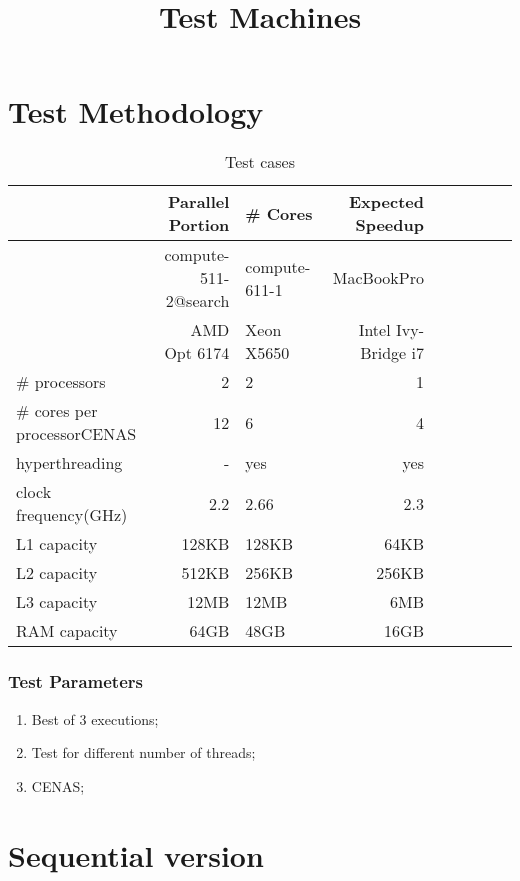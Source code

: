 \documentclass{beamer}
\begin{document}
\section{Test Methodology}
\begin{frame}[plain]
	\title{Test Machines}
		\begin{center}
			\begin{table}[!htp]
			\begin{tabular}{lrlrlrlrl}
			\hline
			 & {Parallel Portion} & \textbf{\# Cores} & \textbf{Expected Speedup}\\
			\hline
			 & compute-511-2@search & compute-611-1 & MacBookPro\\
			 & AMD Opt 6174 & Xeon X5650 & Intel Ivy-Bridge i7\\
			\# processors & 2 & 2 & 1\\
			\# cores per processorCENAS & 12 & 6 & 4\\
			hyperthreading & - & yes & yes\\
			clock frequency(GHz) & 2.2 & 2.66 & 2.3\\
			L1 capacity & 128KB & 128KB & 64KB\\
			L2 capacity & 512KB & 256KB & 256KB\\
			L3 capacity & 12MB & 12MB & 6MB\\
			RAM capacity & 64GB & 48GB & 16GB\\
			\hline
			\end{tabular}
			\caption{Test cases}
			\label{tab:testcases}
			\end{table}
		\end{center}
\end{frame}

\begin{frame}[plain]
	\frametitle{Test Parameters}
	\begin{enumerate}
		\item Best of 3 executions;
		\item Test for different number of threads;
		\item CENAS;
	\end{enumerate}
\end{frame}


\section{Sequential version}
\end{document}
